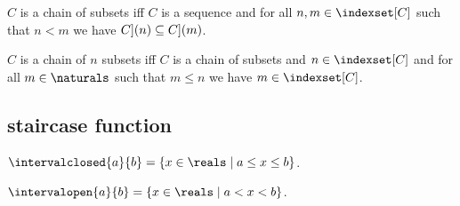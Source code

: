 \begin{definition}\label{cahin_of_subsets}
    $C$ is a chain of subsets iff
    $C$ is a sequence and for all $n,m \in \indexset[C]$ such that $n < m$ we have $\index[C](n) \subseteq \index[C](m)$.
\end{definition}

\begin{definition}\label{chain_of_n_subsets}
    $C$ is a chain of $n$ subsets iff
    $C$ is a chain of subsets and $n \in \indexset[C]$ 
    and for all $m \in \naturals$ such that $m \leq n$ we have $m \in \indexset[C]$.
\end{definition}






%
%



\subsection{staircase function}

\begin{definition}\label{intervalclosed}
    $\intervalclosed{a}{b} = \{x \in \reals \mid a \leq x \leq b\}$.
\end{definition}

\begin{definition}\label{intervalopen}
    $\intervalopen{a}{b} = \{ x \in \reals \mid a < x < b\}$.
\end{definition}


